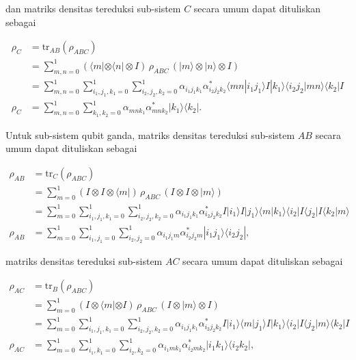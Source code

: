 dan matriks densitas tereduksi sub-sistem $C$ secara umum dapat dituliskan sebagai

\begin{align}
\rho_C &= \mathrm{tr}_{AB}(\rho_{ABC}) \nonumber \\
&= \sum_{m,n=0}^{1} (\langle m| \otimes \langle n| \otimes I)\, \rho_{ABC}\, (|m\rangle \otimes |n\rangle \otimes I) \nonumber \\
&= \sum_{m,n=0}^{1} \sum_{i_1,j_1,k_1=0}^{1} \sum_{i_2,j_2,k_2=0}^{1}
\alpha_{i_1 j_1 k_1}\alpha^{*}_{i_2 j_2 k_2}
\langle mn|i_1 j_1\rangle I |k_1\rangle
\langle i_2 j_2|mn\rangle \langle k_2| I \nonumber \\
\rho_C &= \sum_{m,n=0}^{1} \sum_{k_1,k_2=0}^{1}
\alpha_{m n k_1}\alpha^{*}_{m n k_2}
|k_1\rangle \langle k_2| .
\end{align}

Untuk sub-sistem qubit ganda, matriks densitas tereduksi sub-sistem $AB$ secara umum dapat dituliskan sebagai

\begin{align}
\rho_{AB} &= \mathrm{tr}_C(\rho_{ABC}) \nonumber \\
&= \sum_{m=0}^{1} (I \otimes I \otimes \langle m|)\, \rho_{ABC}\, (I \otimes I \otimes |m\rangle) \nonumber \\
&= \sum_{m=0}^{1} \sum_{i_1,j_1,k_1=0}^{1} \sum_{i_2,j_2,k_2=0}^{1}
\alpha_{i_1 j_1 k_1}\alpha^{*}_{i_2 j_2 k_2}
I |i_1\rangle I |j_1\rangle \langle m|k_1\rangle
\langle i_2| I \langle j_2| I \langle k_2|m\rangle \nonumber \\
\rho_{AB} &= \sum_{m=0}^{1} \sum_{i_1,j_1=0}^{1} \sum_{i_2,j_2=0}^{1}
\alpha_{i_1 j_1 m}\alpha^{*}_{i_2 j_2 m}
|i_1 j_1\rangle \langle i_2 j_2| ,
\end{align}

matriks densitas tereduksi sub-sistem $AC$ secara umum dapat dituliskan sebagai

\begin{align}
\rho_{AC} &= \mathrm{tr}_B(\rho_{ABC}) \nonumber \\
&= \sum_{m=0}^{1} (I \otimes \langle m| \otimes I)\, \rho_{ABC}\, (I \otimes |m\rangle \otimes I) \nonumber \\
&= \sum_{m=0}^{1} \sum_{i_1,j_1,k_1=0}^{1} \sum_{i_2,j_2,k_2=0}^{1}
\alpha_{i_1 j_1 k_1}\alpha^{*}_{i_2 j_2 k_2}
I |i_1\rangle \langle m|j_1\rangle I |k_1\rangle
\langle i_2| I \langle j_2|m\rangle \langle k_2| I \nonumber \\
\rho_{AC} &= \sum_{m=0}^{1} \sum_{i_1,k_1=0}^{1} \sum_{i_2,k_2=0}^{1}
\alpha_{i_1 m k_1}\alpha^{*}_{i_2 m k_2}
|i_1 k_1\rangle \langle i_2 k_2| ,
\end{align}

